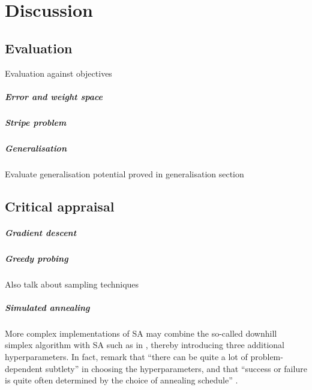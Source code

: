 \chapter{Discussion}

\section{Evaluation}
Evaluation against objectives

\paragraph{Error and weight space}

\paragraph{Stripe problem}

\paragraph{Generalisation}
Evaluate generalisation potential proved in generalisation section

\section{Critical appraisal}
\paragraph{Gradient descent}

\paragraph{Greedy probing}
Also talk about sampling techniques

\paragraph{Simulated annealing}
\label{sec:eval_sim_annealing}
More complex implementations of SA may combine the so-called downhill simplex algorithm \cite{nelder1965} with SA such as in \textcite[p. 444-455]{press1992}, thereby introducing three additional hyperparameters.
In fact, \citeauthor{press1992} remark that ``there can be quite a lot of problem-dependent subtlety'' in choosing the hyperparameters, and that ``success or failure is quite often determined by the choice of annealing schedule'' \cite*[p. 452]{press1992}.


